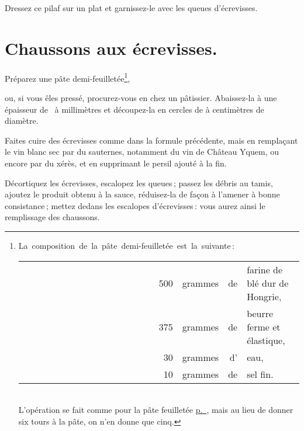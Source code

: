 Dressez ce pilaf sur un plat et garnissez-le avec les queues d'écrevisses.

\section*{\centering Chaussons aux écrevisses.}

Préparez une pâte demi-feuilletée\footnote{La composition de la pâte demi-feuilletée est la suivante :
                                            \label{pg0289} \hypertarget{p0289}{}
                                            \begin{tabular}{r r r l}
                                                500 & grammes & de & farine de blé dur de Hongrie,        \\
                                                375 & grammes & de & beurre ferme et élastique,           \\
                                                 30 & grammes & d' & eau,                                 \\
                                                 10 & grammes & de & sel fin.                             \\
                                            \end{tabular} 
                                            \\
                                           L'opération se fait comme pour la pâte feuilletée
                                           \hyperlink{p0319}{p. \pageref{pg0319}}, mais au lieu de donner 
                                           six tours à la pâte, on n'en donne que cinq.},

ou, si vous êles pressé, procurez-vous en chez un pâtissier. Abaissez-la à une
épaisseur de {\mmm} à {\mmm} millimètres et découpez-la en cercles de
{\mmm} à {\mmm} centimètres de diamètre.

Faites cuire des écrevisses comme dans la formule précédente, mais en
remplaçant le vin blanc sec par du sauternes, notamment du vin de Château
Yquem, ou encore par du xérès, et en supprimant le persil ajouté à la fin.

Décortiquez les écrevisses, escalopez les queues ; passez les débris au tamis,
ajoutez le produit obtenu à la sauce, réduisez-la de façon à l’amener à bonne
consistance ; mettez dedans les escalopes d'écrevisses : vous aurez ainsi le
remplissage des chaussons.

